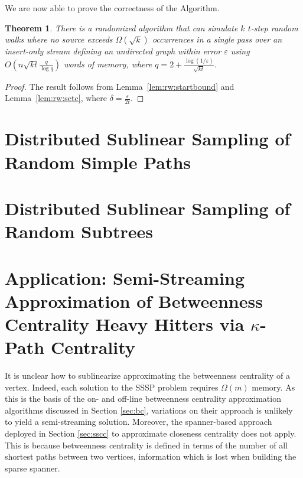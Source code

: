 \documentclass{report}
\newtheorem{theorem}{Theorem}[section]
\newcommand{\algoname}[1]{\textnormal{\textsc{#1}}}
\begin{document}
We are now able to prove the correctness of the Algorithm.
%
\begin{theorem} \label{thm:rw:serial}
There is a randomized algorithm that can simulate $k$ $t$-step random walks where no source exceeds $\Omega(\sqrt{k})$ occurrences in a single pass over an insert-only stream defining an undirected graph within error $\varepsilon$ using $O \left (n \sqrt{kt} \frac{q}{\log q} \right )$ words of memory, where $q = 2 + \frac{\log(1/\varepsilon)}{\sqrt{kt}}$.
\end{theorem}
%
\begin{proof}
The result follows from Lemma~\ref{lem:rw:startbound} and Lemma~\ref{lem:rw:setc}, where $\delta = \frac{\varepsilon}{2t}$.
\end{proof}

\section{Distributed Sublinear Sampling of Random Simple Paths}
 \label{walks:sec:paths}


\section{Distributed Sublinear Sampling of Random Subtrees}
 \label{walks:sec:trees}


\section{Application: Semi-Streaming Approximation of Betweenness Centrality Heavy Hitters via $\kappa$-Path Centrality} 
\label{sec:sskpc}

It is unclear how to sublinearize approximating the betweenness centrality of a vertex.
Indeed, each solution to the \algoname{SSSP} problem requires $\Omega(m)$ memory.
As this is the basis of the on- and off-line  betweenness centrality approximation algorithms discussed in Section \ref{sec:bc}, variations on their approach is unlikely to yield a semi-streaming solution.
Moreover, the spanner-based approach deployed in Section \ref{sec:sscc} to approximate closeness centrality does not apply.
This is because betweenness centrality is defined in terms of the number of all shortest paths between two vertices, information which is lost when building the sparse spanner.
\end{document}
